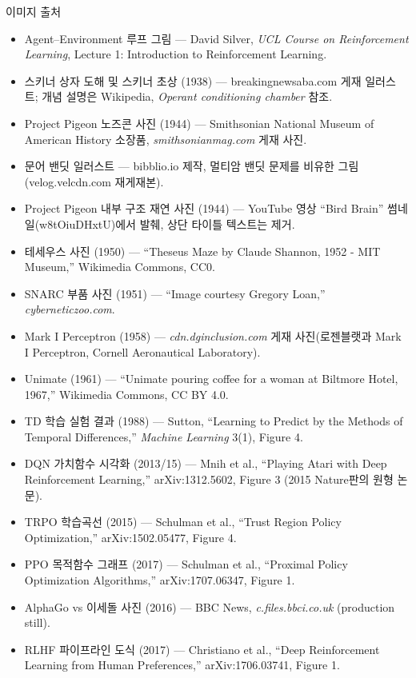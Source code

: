 \begin{frame}{이미지 출처}
  \scriptsize
  \begin{itemize}
    \item Agent--Environment 루프 그림 --- David Silver,
      \textit{UCL Course on Reinforcement Learning}, Lecture 1:
      Introduction to Reinforcement Learning.
    \item 스키너 상자 도해 및 스키너 초상 (1938) ---
      breakingnewsaba.com 게재 일러스트; 개념 설명은 Wikipedia,
      \textit{Operant conditioning chamber} 참조.
    \item Project Pigeon 노즈콘 사진 (1944) --- Smithsonian
      National Museum of American History 소장품,
      \textit{smithsonianmag.com} 게재 사진.
    \item 문어 밴딧 일러스트 --- bibblio.io 제작, 멀티암 밴딧
      문제를 비유한 그림 (velog.velcdn.com 재게재본).
    \item Project Pigeon 내부 구조 재연 사진 (1944) --- YouTube
      영상 ``Bird Brain'' 썸네일(w8tOiuDHxtU)에서 발췌, 상단
      타이틀 텍스트는 제거.
    \item 테세우스 사진 (1950) --- ``Theseus Maze by Claude Shannon,
      1952 - MIT Museum,'' Wikimedia Commons, CC0.
    \item SNARC 부품 사진 (1951) --- ``Image courtesy Gregory Loan,''
      \textit{cyberneticzoo.com}.
    \item Mark I Perceptron (1958) --- \textit{cdn.dginclusion.com}
      게재 사진(로젠블랫과 Mark I Perceptron, Cornell Aeronautical
      Laboratory).
    \item Unimate (1961) --- ``Unimate pouring coffee for a woman at
      Biltmore Hotel, 1967,'' Wikimedia Commons, CC BY 4.0.
    \item TD 학습 실험 결과 (1988) --- Sutton, ``Learning to
      Predict by the Methods of Temporal Differences,''
      \textit{Machine Learning} 3(1), Figure 4.
    \item DQN 가치함수 시각화 (2013/15) --- Mnih et al., ``Playing
      Atari with Deep Reinforcement Learning,'' arXiv:1312.5602,
      Figure 3 (2015 Nature판의 원형 논문).
    \item TRPO 학습곡선 (2015) --- Schulman et al., ``Trust Region
      Policy Optimization,'' arXiv:1502.05477, Figure 4.
    \item PPO 목적함수 그래프 (2017) --- Schulman et al., ``Proximal
      Policy Optimization Algorithms,'' arXiv:1707.06347, Figure 1.
    \item AlphaGo vs 이세돌 사진 (2016) --- BBC News,
      \textit{c.files.bbci.co.uk} (production still).
    \item RLHF 파이프라인 도식 (2017) --- Christiano et al., ``Deep
      Reinforcement Learning from Human Preferences,''
      arXiv:1706.03741, Figure 1.
  \end{itemize}
\end{frame}
